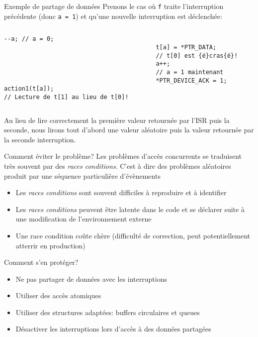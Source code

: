 \begin{frame}[fragile]{Exemple de partage de données}
  Prenons le  cas où  \verb+f+ traite l'interruption  précédente (donc
  \verb+a = 1+) et qu'une nouvelle interruption est déclenchée:
  \begin{columns}
    \begin{column}{5cm}
      \begin{lstlisting}[showlines=true,emptylines=10]
--a; // a = 0;





action1(t[a]);
// Lecture de t[1] au lieu de t[0]!
       \end{lstlisting}
     \end{column}
     \begin{column}{5cm}
      \begin{lstlisting}[showlines=true,emptylines=10,escapeinside=\{\}]

t[a] = *PTR_DATA;
// t[0] est {é}cras{é}!
a++;
// a = 1 maintenant
*PTR_DEVICE_ACK = 1;


       \end{lstlisting}
    \end{column}
  \end{columns}
  Au lieu de lire correctement  la première valeur retournée par l'ISR
  puis la seconde, nous lirons  tout d'abord une valeur aléatoire puis
  la valeur retournée par la seconde interruption.
\end{frame}

\begin{frame}{Comment éviter le problème?}
  Les problèmes d'accès concurrents se traduisent très souvent par des
  \emph{races  conditions}.   C'est à  dire  des problèmes  aléatoires
  produit par une séquence particulière d'évènements
  \begin{itemize}
  \item   Les  \emph{races  conditions}   sont  souvent   difficiles  à
    reproduire et à identifier
  \item Les  \emph{races conditions} peuvent être latente  dans le code
    et se déclarer suite à une modification de l'environnement externe
  \item Une race condition coûte chère (difficulté de correction, peut
    potentiellement atterrir en production)
  \end{itemize}
  Comment s'en protéger?
  \begin{itemize}
  \item  Ne  pas  partager de données avec les interruptions
  \item Utiliser des accès atomiques
  \item  Utiliser  des  structures  adaptées: buffers  circulaires  et
    queues
  \item  Désactiver  les  interruptions  lors  d'accès  à  des  données
    partagées
  \end{itemize}
\end{frame}

